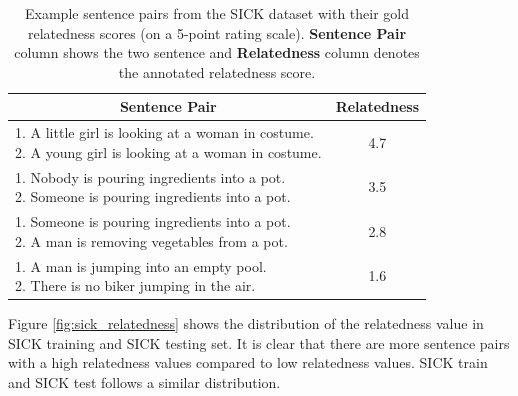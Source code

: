 \begin{enumerate}
  \begin{table}[ht!]
  	\centering 	
  	\begin{tabular}{l|c} 
  		\hline
  		\multicolumn{1}{c|}{\textbf{Sentence Pair}} & 
  		\multicolumn{1}{c}{\textbf{Relatedness}}  \\
  		\hline
  		\makecell[l]
  		{1. A little girl is looking at a woman in costume. \\ 
  		 2. A young girl is looking at a woman in costume.} & 4.7  \\
  		\hline
  			\makecell[l]
  		{1. Nobody is pouring ingredients into a pot. \\ 
  			2. Someone is pouring ingredients into a pot. } & 3.5  \\
  		\hline
  		\makecell[l]
  		{1. Someone is pouring ingredients into a pot. \\ 
  		 2. A man is removing vegetables from a pot. } & 2.8  \\
  		\hline
  		\makecell[l]
  		{1. A man is jumping into an empty pool. \\ 
  		 2. There is no biker jumping in the air. } & 1.6  \\
  		\hline               
  	\end{tabular}
  	\caption[Example sentence pairs from the SICK dataset]{Example sentence pairs from the SICK dataset with their gold relatedness scores (on a 5-point rating scale). \textbf{Sentence Pair} column shows the two sentence and \textbf{Relatedness} column denotes the annotated relatedness score.}
  	\label{tab:sickdata}
  \end{table}

Figure \ref{fig:sick_relatedness} shows the distribution of the relatedness value in SICK training and SICK testing set. It is clear that there are more sentence pairs with a high relatedness values compared to low relatedness values. SICK train and SICK test follows a similar distribution. 



\end{enumerate}
